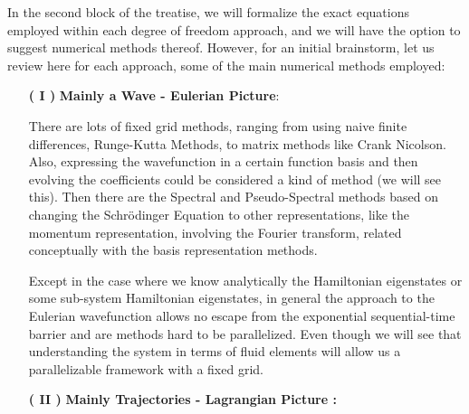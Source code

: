 \documentclass[11pt, a4paper]{article} %
\begin{document}
In the second block of the treatise, we will formalize the exact equations employed within each degree of freedom approach, and we will have the option to suggest numerical methods thereof. However, for an initial brainstorm, let us review here for each approach, some of the main numerical methods employed:\vspace{-0.25cm}
\begin{enumerate}
\item[\bf ( I )] {\bf Mainly a Wave - Eulerian Picture}:\vspace{0.15cm}

There are lots of fixed grid methods, ranging from using naive finite differences, Runge-Kutta Methods, to matrix methods like Crank Nicolson. Also, expressing the wavefunction in a certain function basis and then evolving the coefficients could be considered a kind of method (we will see this). Then there are the Spectral and Pseudo-Spectral methods based on changing the Schrödinger Equation to other representations, like the momentum representation, involving the Fourier transform, related conceptually with the basis representation methods. 

Except in the case where we know analytically the Hamiltonian eigenstates or some sub-system Hamiltonian eigenstates, in general the approach to the Eulerian wavefunction allows no escape from the exponential sequential-time barrier and are methods hard to be parallelized. Even though we will see that understanding the system in terms of fluid elements will allow us a parallelizable framework with a fixed grid.\vspace{0.2cm}

\item [\bf ( II )] {\bf Mainly Trajectories - Lagrangian Picture :}\vspace{0.15cm}


\end{enumerate}
\end{document}
